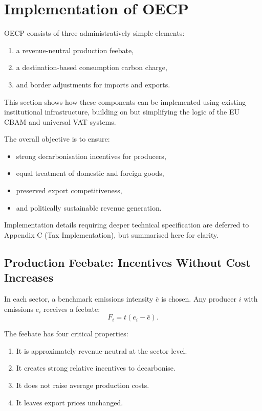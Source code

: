 \documentclass[12pt]{article}
\begin{document}
\section{Implementation of OECP}

OECP consists of three administratively simple elements:
\begin{enumerate}
    \item a revenue-neutral production feebate,
    \item a destination-based consumption carbon charge,
    \item and border adjustments for imports and exports.
\end{enumerate}
This section shows how these components can be implemented using existing
institutional infrastructure, building on but simplifying the logic of the EU CBAM
and universal VAT systems.

The overall objective is to ensure:
\begin{itemize}
    \item strong decarbonisation incentives for producers,
    \item equal treatment of domestic and foreign goods,
    \item preserved export competitiveness,
    \item and politically sustainable revenue generation.
\end{itemize}

Implementation details requiring deeper technical specification are deferred to
Appendix C (Tax Implementation), but summarised here for clarity.

\subsection{Production Feebate: Incentives Without Cost Increases}

In each sector, a benchmark emissions intensity $\bar e$ is chosen.  
Any producer $i$ with emissions $e_i$ receives a feebate:
\[
F_i = t (e_i - \bar e).
\]

The feebate has four critical properties:
\begin{enumerate}
    \item It is approximately revenue-neutral at the sector level.
    \item It creates strong relative incentives to decarbonise.
    \item It does not raise average production costs.
    \item It leaves export prices unchanged.
\end{enumerate}
\end{document}

